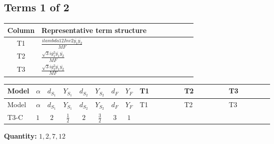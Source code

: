 \documentclass[8pt]{article}
\begin{document}
\begin{landscape}
\subsection*{Terms 1 of 2}
\begin{center}
\begin{tabular}{@{}c >{\raggedright\arraybackslash}p{0.82\linewidth}@{}}
\toprule
Column & Representative term structure \\
\midrule
T1 & \(\displaystyle \frac{i lambda12Inv2 \overline{y_{1}} \overline{y_{2}}}{MF}\) \\
\midrule
T2 & \(\displaystyle \frac{\sqrt{3} i g_{1}^{2} \overline{y_{1}} \overline{y_{2}}}{MF}\) \\
\midrule
T3 & \(\displaystyle \frac{\sqrt{3} i g_{2}^{2} \overline{y_{1}} \overline{y_{2}}}{MF}\) \\
\midrule
\bottomrule
\end{tabular}
\end{center}
\smallskip
\tiny
\begin{longtable}{@{}llcccccc >{\raggedright\arraybackslash}p{0.21\linewidth} >{\raggedright\arraybackslash}p{0.21\linewidth} >{\raggedright\arraybackslash}p{0.21\linewidth}@{}}
\toprule
Model & $\alpha$ & $d_{S_1}$ & $Y_{S_1}$ & $d_{S_2}$ & $Y_{S_2}$ & $d_F$ & $Y_F$ & T1 & T2 & T3 \\
\midrule
\endfirsthead
\toprule
Model & $\alpha$ & $d_{S_1}$ & $Y_{S_1}$ & $d_{S_2}$ & $Y_{S_2}$ & $d_F$ & $Y_F$ & T1 & T2 & T3 \\
\midrule
\endhead
T3-C & $1$ & $2$ & $\frac{1}{2}$ & $2$ & $\frac{3}{2}$ & $3$ & $1$ & \scriptsize\adjustbox{max width=\linewidth}{$\begin{gathered} \frac{i lambda12Inv2 \overline{y_{1}} \overline{y_{2}}}{6 MF}\end{gathered}$} & \scriptsize\adjustbox{max width=\linewidth}{$\begin{gathered} \frac{\sqrt{3} i g_{1}^{2} \overline{y_{1}} \overline{y_{2}}}{4 MF}\end{gathered}$} & \scriptsize\adjustbox{max width=\linewidth}{$\begin{gathered} \frac{\sqrt{3} i g_{2}^{2} \overline{y_{1}} \overline{y_{2}}}{8 MF}\end{gathered}$} \\
\midrule
\bottomrule
\end{longtable}
\clearpage
\noindent\textbf{Quantity: }$\mathrm{1,2,7,12}$\par\smallskip

\end{landscape}
\end{document}
